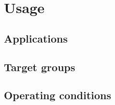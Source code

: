 \section{Usage}

\subsection{Applications}

\subsection{Target groups}

\subsection{Operating conditions}
